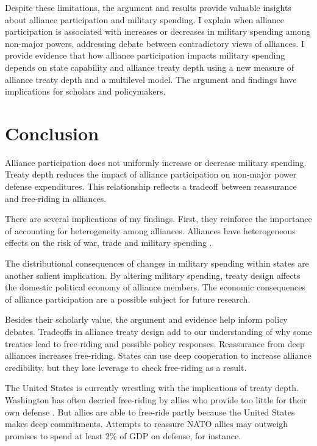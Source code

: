 \documentclass[12pt]{article}
\begin{document}
Despite these limitations, the argument and results provide valuable insights about alliance participation and military spending. 
I explain when alliance participation is associated with increases or decreases in military spending among non-major powers, addressing debate between contradictory views of alliances.  
I provide evidence that how alliance participation impacts military spending depends on state capability and alliance treaty depth using a new measure of alliance treaty depth and a multilevel model. 
The argument and findings have implications for scholars and policymakers. 


\section*{Conclusion}

Alliance participation does not uniformly increase or decrease military spending. 
Treaty depth reduces the impact of alliance participation on non-major power defense expenditures. 
This relationship reflects a tradeoff between reassurance and free-riding in alliances. 


There are several implications of my findings.  
First, they reinforce the importance of accounting for heterogeneity among alliances.
Alliances have heterogeneous effects on the risk of war, trade and military spending \citep{Leeds2003, LongLeeds2006, Benson2012, DigiuseppePoast2016}. 


The distributional consequences of changes in military spending within states are another salient implication.  
By altering military spending, treaty design affects the domestic political economy of alliance members. 
The economic consequences of alliance participation are a possible subject for future research. 


Besides their scholarly value, the argument and evidence help inform policy debates. 
Tradeoffs in alliance treaty design add to our understanding of why some treaties lead to free-riding and possible policy responses. 
Reassurance from deep alliances increases free-riding. 
States can use deep cooperation to increase alliance credibility, but they lose leverage to check free-riding as a result. 


The United States is currently wrestling with the implications of treaty depth. 
Washington has often decried free-riding by allies who provide too little for their own defense \citep{Lanoszka2015}. 
But allies are able to free-ride partly because the United States makes deep commitments. 
Attempts to reassure NATO allies may outweigh promises to spend at least 2\% of GDP on defense, for instance.
\end{document}
